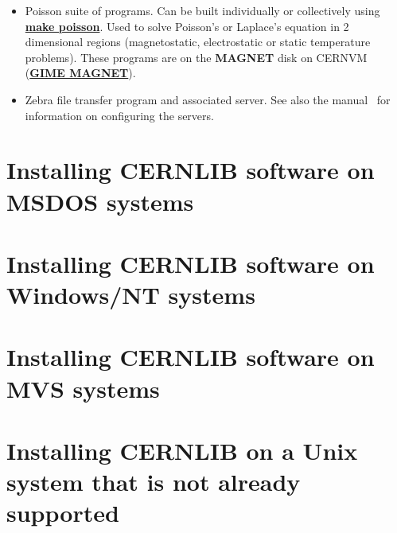\begin{itemize}
\item
Poisson suite of programs. Can be built individually or collectively
using {\underline {\bf make poisson}}. Used to solve Poisson's or Laplace's equation
in 2 dimensional regions (magnetostatic, electrostatic or static
temperature problems). These programs are on the {\bf MAGNET}
disk on CERNVM ({\underline {\bf GIME MAGNET}}).

\item
Zebra file transfer program and associated server. See also the \CSPACK{} manual~\cite{bib-CSPACK}
for information on configuring the servers.

\end{itemize}

\chapter{Installing CERNLIB software on MSDOS systems}

\chapter{Installing CERNLIB software on Windows/NT systems}

\chapter{Installing CERNLIB software on MVS systems}

\chapter{Installing CERNLIB on a Unix system that is not already supported}

